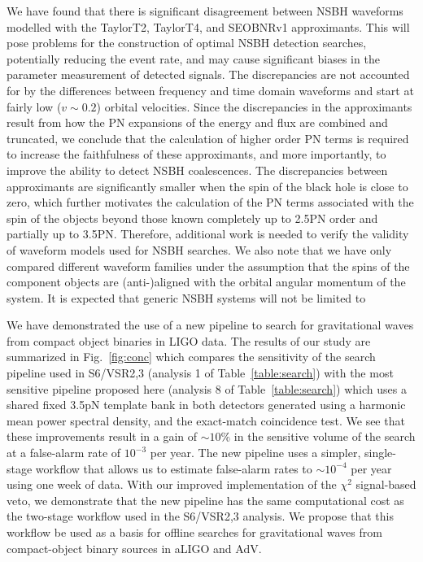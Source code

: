 We have found that there is significant disagreement between \ac{NSBH}
waveforms modelled with the TaylorT2, TaylorT4, and SEOBNRv1 approximants. 
This will pose problems for the construction of optimal NSBH detection searches, 
potentially reducing the event rate, 
and may cause significant biases in the parameter measurement of detected signals.
The discrepancies are not accounted for by the differences between
frequency and time domain waveforms and start at fairly low ($v \sim 0.2$) orbital velocities.
Since the discrepancies in the approximants result from how the \ac{PN} expansions of the energy and flux
are combined and truncated, we conclude
that the calculation of higher order \ac{PN} terms is required to increase the
faithfulness of these approximants, and more importantly, to improve the
ability to detect \ac{NSBH} coalescences. The
discrepancies between approximants are significantly smaller when the spin of
the black hole is close to zero, which further motivates the calculation of the
\ac{PN} terms associated with the spin of the objects beyond those known
completely up to 2.5\ac{PN} order and partially up to 3.5\ac{PN}.
Therefore, additional work is needed to verify
the validity of waveform models used for \ac{NSBH} searches.
We also note that we have
only compared different waveform families under the assumption that the spins
of the component objects are (anti-)aligned with the orbital angular momentum
of the system.  It is expected that generic \ac{NSBH} systems will not be limited to


We have demonstrated the use of a new pipeline to search for gravitational
waves from compact object binaries in LIGO data.  The results of our study are
summarized in Fig.~\ref{fig:conc} which compares the sensitivity of the search
pipeline used in S6/VSR2,3 (analysis 1 of Table~\ref{table:search}) with the
most sensitive pipeline proposed here (analysis 8 of Table~\ref{table:search})
which uses a shared fixed 3.5pN template bank in both detectors generated using 
a harmonic mean power spectral density, and the exact-match coincidence test.  
We see that these improvements result in a gain of $\sim 10\%$ in the sensitive
volume of the search at a false-alarm rate of $10^{-3}$ per year. 
The new pipeline uses a simpler, single-stage workflow that allows us to
estimate false-alarm rates to $\sim 10^{-4}$ per year using one week of data. With our improved
implementation of the $\chi^2$ signal-based veto, we demonstrate that the new
pipeline has the same computational cost as the two-stage workflow used in the S6/VSR2,3
analysis. We propose that this workflow be used as a basis for offline
searches for gravitational waves from compact-object binary sources in aLIGO
and AdV.

